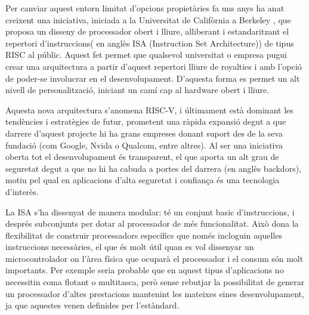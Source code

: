\documentclass[10pt,a4paper,twocolumn,twoside]{article}
\begin{document}
Per canviar aquest entorn limitat d'opcions propietàries fa uns anys ha anat creixent una iniciativa, iniciada a la Universitat de Califòrnia a Berkeley \cite{krste_asanovic_instruction_2014}, que proposa un disseny de processador obert i lliure, alliberant i estandaritzant el repertori d'instruccions( en anglès ISA (Instruction Set Architecture)) de tipus RISC al públic. Aquest fet permet que qualsevol universitat o empresa pugui crear una arquitectura a partir d'aquest repertori lliure de royalties i amb l'opció de poder-se involucrar en el desenvolupament. D'aquesta forma es permet un alt nivell de personalització, iniciant un camí cap al hardware obert i lliure. 

Aquesta nova arquitectura s'anomena RISC-V, i últimament està dominant les tendències i estratègies de futur, prometent una ràpida expansió degut a que darrere d'aquest projecte hi ha grans empreses donant suport des de la seva fundació (com Google, Nvida o Qualcom, entre altres). 
Al ser una iniciativa oberta tot el desenvolupament és transparent, el que aporta un alt grau de seguretat degut a que no hi ha cabuda a portes del darrera (en anglès backdors), motiu pel qual en aplicacions d'alta seguretat i confiança és una tecnologia d'interès.

La ISA s'ha dissenyat de manera modular: té un conjunt basic d’instruccions, i després subconjunts per dotar al processador de més funcionalitat. 
Això dona la flexibilitat de construir processadors específics que només incloguin aquelles instruccions necessàries, el que és molt útil quan es vol dissenyar un microcontrolador on l’àrea física que ocuparà el processador i el consum són molt importants. 
Per exemple seria probable que en aquest tipus d’aplicacions no necessitin coma flotant o multitasca, però sense rebutjar la possibilitat de generar un processador d'altes prestacions mantenint les mateixes eines desenvolupament, ja que aquestes venen definides per l'estàndard.
\end{document}
